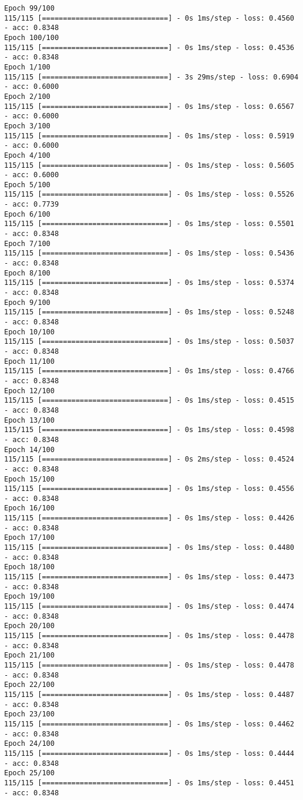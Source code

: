 \documentclass[11pt]{article}
\begin{document}
\begin{Verbatim}[commandchars=\\\{\}]
Epoch 99/100
115/115 [==============================] - 0s 1ms/step - loss: 0.4560 - acc: 0.8348
Epoch 100/100
115/115 [==============================] - 0s 1ms/step - loss: 0.4536 - acc: 0.8348
Epoch 1/100
115/115 [==============================] - 3s 29ms/step - loss: 0.6904 - acc: 0.6000
Epoch 2/100
115/115 [==============================] - 0s 1ms/step - loss: 0.6567 - acc: 0.6000
Epoch 3/100
115/115 [==============================] - 0s 1ms/step - loss: 0.5919 - acc: 0.6000
Epoch 4/100
115/115 [==============================] - 0s 1ms/step - loss: 0.5605 - acc: 0.6000
Epoch 5/100
115/115 [==============================] - 0s 1ms/step - loss: 0.5526 - acc: 0.7739
Epoch 6/100
115/115 [==============================] - 0s 1ms/step - loss: 0.5501 - acc: 0.8348
Epoch 7/100
115/115 [==============================] - 0s 1ms/step - loss: 0.5436 - acc: 0.8348
Epoch 8/100
115/115 [==============================] - 0s 1ms/step - loss: 0.5374 - acc: 0.8348
Epoch 9/100
115/115 [==============================] - 0s 1ms/step - loss: 0.5248 - acc: 0.8348
Epoch 10/100
115/115 [==============================] - 0s 1ms/step - loss: 0.5037 - acc: 0.8348
Epoch 11/100
115/115 [==============================] - 0s 1ms/step - loss: 0.4766 - acc: 0.8348
Epoch 12/100
115/115 [==============================] - 0s 1ms/step - loss: 0.4515 - acc: 0.8348
Epoch 13/100
115/115 [==============================] - 0s 1ms/step - loss: 0.4598 - acc: 0.8348
Epoch 14/100
115/115 [==============================] - 0s 2ms/step - loss: 0.4524 - acc: 0.8348
Epoch 15/100
115/115 [==============================] - 0s 1ms/step - loss: 0.4556 - acc: 0.8348
Epoch 16/100
115/115 [==============================] - 0s 1ms/step - loss: 0.4426 - acc: 0.8348
Epoch 17/100
115/115 [==============================] - 0s 1ms/step - loss: 0.4480 - acc: 0.8348
Epoch 18/100
115/115 [==============================] - 0s 1ms/step - loss: 0.4473 - acc: 0.8348
Epoch 19/100
115/115 [==============================] - 0s 1ms/step - loss: 0.4474 - acc: 0.8348
Epoch 20/100
115/115 [==============================] - 0s 1ms/step - loss: 0.4478 - acc: 0.8348
Epoch 21/100
115/115 [==============================] - 0s 1ms/step - loss: 0.4478 - acc: 0.8348
Epoch 22/100
115/115 [==============================] - 0s 1ms/step - loss: 0.4487 - acc: 0.8348
Epoch 23/100
115/115 [==============================] - 0s 1ms/step - loss: 0.4462 - acc: 0.8348
Epoch 24/100
115/115 [==============================] - 0s 1ms/step - loss: 0.4444 - acc: 0.8348
Epoch 25/100
115/115 [==============================] - 0s 1ms/step - loss: 0.4451 - acc: 0.8348

\end{Verbatim}
\end{document}

